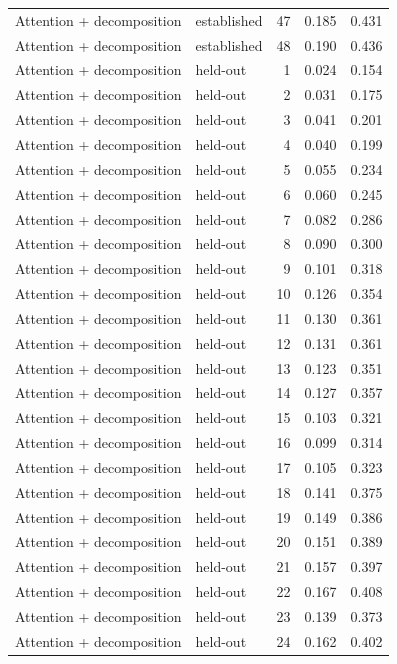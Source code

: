 \begin{tabular}{llrrr}
Attention + decomposition & established & 47 & 0.185 & 0.431 \\
Attention + decomposition & established & 48 & 0.190 & 0.436 \\
Attention + decomposition & held-out & 1 & 0.024 & 0.154 \\
Attention + decomposition & held-out & 2 & 0.031 & 0.175 \\
Attention + decomposition & held-out & 3 & 0.041 & 0.201 \\
Attention + decomposition & held-out & 4 & 0.040 & 0.199 \\
Attention + decomposition & held-out & 5 & 0.055 & 0.234 \\
Attention + decomposition & held-out & 6 & 0.060 & 0.245 \\
Attention + decomposition & held-out & 7 & 0.082 & 0.286 \\
Attention + decomposition & held-out & 8 & 0.090 & 0.300 \\
Attention + decomposition & held-out & 9 & 0.101 & 0.318 \\
Attention + decomposition & held-out & 10 & 0.126 & 0.354 \\
Attention + decomposition & held-out & 11 & 0.130 & 0.361 \\
Attention + decomposition & held-out & 12 & 0.131 & 0.361 \\
Attention + decomposition & held-out & 13 & 0.123 & 0.351 \\
Attention + decomposition & held-out & 14 & 0.127 & 0.357 \\
Attention + decomposition & held-out & 15 & 0.103 & 0.321 \\
Attention + decomposition & held-out & 16 & 0.099 & 0.314 \\
Attention + decomposition & held-out & 17 & 0.105 & 0.323 \\
Attention + decomposition & held-out & 18 & 0.141 & 0.375 \\
Attention + decomposition & held-out & 19 & 0.149 & 0.386 \\
Attention + decomposition & held-out & 20 & 0.151 & 0.389 \\
Attention + decomposition & held-out & 21 & 0.157 & 0.397 \\
Attention + decomposition & held-out & 22 & 0.167 & 0.408 \\
Attention + decomposition & held-out & 23 & 0.139 & 0.373 \\
Attention + decomposition & held-out & 24 & 0.162 & 0.402 \\

\end{tabular}
